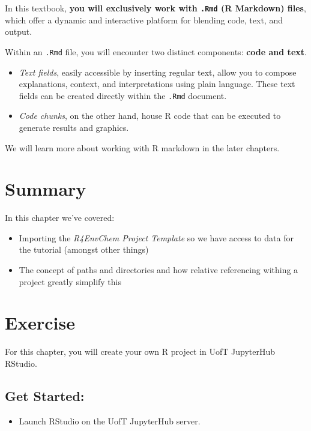 \documentclass[
]{book}
\providecommand{\tightlist}{%
  \setlength{\itemsep}{0pt}\setlength{\parskip}{0pt}}
\begin{document}
In this textbook, \textbf{you will exclusively work with \texttt{.Rmd} (R Markdown) files}, which offer a dynamic and interactive platform for blending code, text, and output.

Within an \texttt{.Rmd} file, you will encounter two distinct components: \textbf{code and text}.

\begin{itemize}
\tightlist
\item
  \emph{Text fields}, easily accessible by inserting regular text, allow you to compose explanations, context, and interpretations using plain language. These text fields can be created directly within the \texttt{.Rmd} document.
\item
  \emph{Code chunks}, on the other hand, house R code that can be executed to generate results and graphics.
\end{itemize}

We will learn more about working with R markdown in the later chapters.

\hypertarget{summary-1}{%
\section{Summary}\label{summary-1}}

In this chapter we've covered:

\begin{itemize}
\tightlist
\item
  Importing the \emph{R4EnvChem Project Template} so we have access to data for the tutorial (amongst other things)
\item
  The concept of paths and directories and how relative referencing withing a project greatly simplify this
\end{itemize}

\hypertarget{exercise-1}{%
\section{Exercise}\label{exercise-1}}

For this chapter, you will create your own R project in UofT JupyterHub RStudio.

\hypertarget{get-started}{%
\subsection{Get Started:}\label{get-started}}

\begin{itemize}
\tightlist
\item
  Launch RStudio on the UofT JupyterHub server.
\end{itemize}
\end{document}
